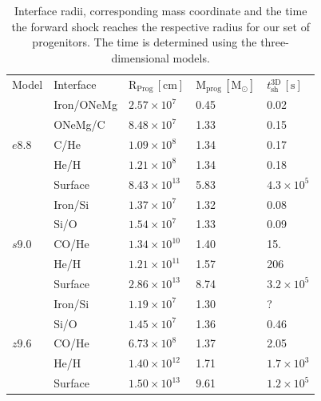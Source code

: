 \documentclass[fleqn,usenatbib]{mnras}
\begin{document}
\begin{table}
   \begin{tabular}{l l l l l} 
   \hline
     Model      &Interface & $\mathrm{R_{Prog}\,[cm]}$ & $\mathrm{M_{prog}\,[M_{\odot}]}$ & $t_{\mathrm{sh}}^{\mathrm{3D}}\,\mathrm{[s]}$\\ [0.5ex] 
   \multirow{5}{*}{$e8.8$} & Iron/ONeMg & $2.57\times 10^{7}$  & 0.45 & 0.02 \\ 
                           & ONeMg/C    & $8.48\times 10^{7}$  & 1.33 & 0.15 \\
                           & C/He       & $1.09\times 10^{8}$  & 1.34 & 0.17 \\
                           & He/H       & $1.21\times 10^{8}$  & 1.34 & 0.18\\
                           & Surface    & $8.43\times 10^{13}$ & 5.83 & $4.3\times10^5$\\
   \hline
   \multirow{5}{*}{$s9.0$} & Iron/Si    & $1.37\times 10^{7}$   & 1.32 & 0.08 \\ 
                           & Si/O       & $1.54\times 10^{7}$   & 1.33 & 0.09 \\ 
                           & CO/He      & $1.34\times 10^{10}$  & 1.40 & 15. \\
                           & He/H       & $1.21\times 10^{11}$  & 1.57 & 206 \\
                           & Surface    & $2.86\times 10^{13}$  & 8.74 & $3.2\times 10^5$ \\
   \hline
   \multirow{5}{*}{$z9.6$} & Iron/Si    & $1.19\times 10^{7}$  & 1.30 & ?\\ 
                           & Si/O       & $1.45\times 10^{7}$  & 1.36 & 0.46\\ 
                           & CO/He      & $6.73\times 10^{8}$  & 1.37 & 2.05\\
                           & He/H       & $1.40\times 10^{12}$ & 1.71 & $1.7\times10^{3}$\\
                           & Surface    & $1.50\times 10^{13}$ & 9.61 & $1.2\times10^5$  \\
   \end{tabular}
   \caption{Interface radii, corresponding mass coordinate and the time the forward shock reaches the respective radius for our set of progenitors. The time is determined using the three-dimensional models.}
   \label{tab:progenitors}
\end{table}
\end{document}
